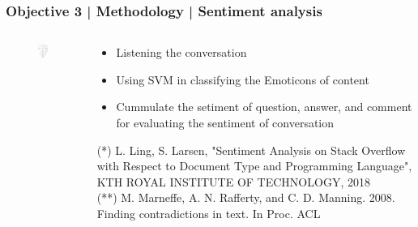 \documentclass{beamer}
\begin{document}
\begin{frame}
\frametitle{Objective 3 | Methodology | Sentiment analysis}
\begin{columns}
	
	\begin{column}{.5\textwidth}
\begin{figure}
	\includegraphics[width=48mm]{st6.png}	
	
\end{figure}
\end{column}
\begin{column}{.5\textwidth}
{\scriptsize \begin{itemize}
	\item Listening the conversation
	\item Using SVM in classifying the Emoticons of content
	\item Cummulate the setiment of question, answer, and comment for evaluating the sentiment of conversation
\end{itemize}}
{\tiny (*) L. Ling, S. Larsen, "Sentiment Analysis on Stack Overflow with
Respect to Document Type and
Programming Language", KTH ROYAL INSTITUTE OF TECHNOLOGY, 2018}\\
{\tiny (**) M. Marneffe, A. N. Rafferty, and
C. D. Manning. 2008. Finding contradictions in text. In Proc. ACL}
\end{column}

\end{columns}	
\end{frame}
\end{document}
